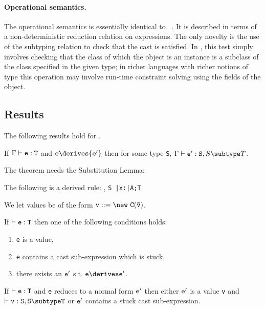 \paragraph{Operational semantics.}

The operational semantics is essentially identical
to \FJ~\cite{FJ}. It is described in terms of a non-deterministic
reduction relation on expressions. The only novelty is the use of the
subtyping relation to check that the cast is satisfied. In \FXZ, this
test simply involves checking that the class of which the object is an
instance is a subclass of the class specified in the given type; in
richer languages with richer notions of type this operation may
involve run-time constraint solving using the fields of the object.


\subsection{Results}
The following results hold for \FXD.

\begin{theorem} If $\Gamma \vdash {\tt e:T}$ and ${\tt e} \derives {\tt e'}$ then for some type {\tt S}, $\Gamma \vdash {\tt e':S},{S \subtype T}$.
\end{theorem}

The theorem needs the Substitution Lemma:
\begin{lemma} The following is a derived rule:
{\Gamma {}, {\tt S \subtype \bar{\tt x}:\bar{\tt A};T}}
\end{lemma}

We let values be of the form $\tt v ::= \new\ C(\bar{\tt v})$. 
\begin{theorem}[Progress]
If $\vdash {\tt e:T}$ then one of the following conditions holds:
\begin{enumerate}
\item {\tt e} is a value,
\item {\tt e} contains a cast sub-expression which is stuck,
\item there exists an $\tt e'$ s.t. $\tt e\derives e'$.
\end{enumerate}
\end{theorem}

\begin{theorem}
If $\vdash {\tt e:T}$ and {\tt e} reduces to a normal form ${\tt e'}$ then
either $\tt e'$ is a value {\tt v} and $\vdash {\tt v:S},{\tt S\subtype T}$ or
${\tt e'}$ contains  a stuck cast sub-expression.
\end{theorem}





